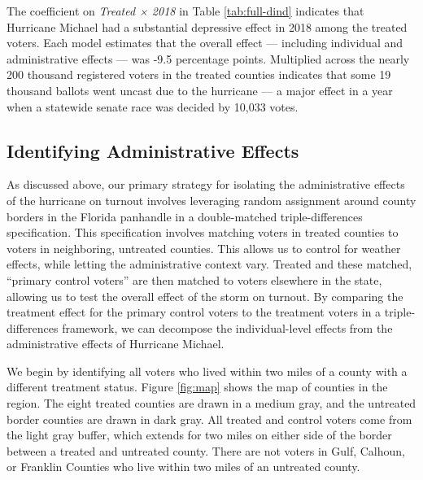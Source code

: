 \documentclass[
  12pt,
]{article}
\begin{document}
\begin{singlespace}

\end{singlespace}

The coefficient on \emph{Treated × 2018} in Table \ref{tab:full-dind} indicates that Hurricane Michael had a substantial depressive effect in 2018 among the treated voters. Each model estimates that the overall effect --- including individual and administrative effects --- was -9.5 percentage points. Multiplied across the nearly 200 thousand registered voters in the treated counties indicates that some 19 thousand ballots went uncast due to the hurricane --- a major effect in a year when a statewide senate race was decided by 10,033 votes.

\hypertarget{identifying-administrative-effects}{%
\subsection*{Identifying Administrative Effects}\label{identifying-administrative-effects}}

As discussed above, our primary strategy for isolating the administrative effects of the hurricane on turnout involves leveraging random assignment around county borders in the Florida panhandle in a double-matched triple-differences specification. This specification involves matching voters in treated counties to voters in neighboring, untreated counties. This allows us to control for weather effects, while letting the administrative context vary. Treated and these matched, ``primary control voters'' are then matched to voters elsewhere in the state, allowing us to test the overall effect of the storm on turnout. By comparing the treatment effect for the primary control voters to the treatment voters in a triple-differences framework, we can decompose the individual-level effects from the administrative effects of Hurricane Michael.

We begin by identifying all voters who lived within two miles of a county with a different treatment status. Figure \ref{fig:map} shows the map of counties in the region. The eight treated counties are drawn in a medium gray, and the untreated border counties are drawn in dark gray. All treated and control voters come from the light gray buffer, which extends for two miles on either side of the border between a treated and untreated county. There are not voters in Gulf, Calhoun, or Franklin Counties who live within two miles of an untreated county.
\end{document}
